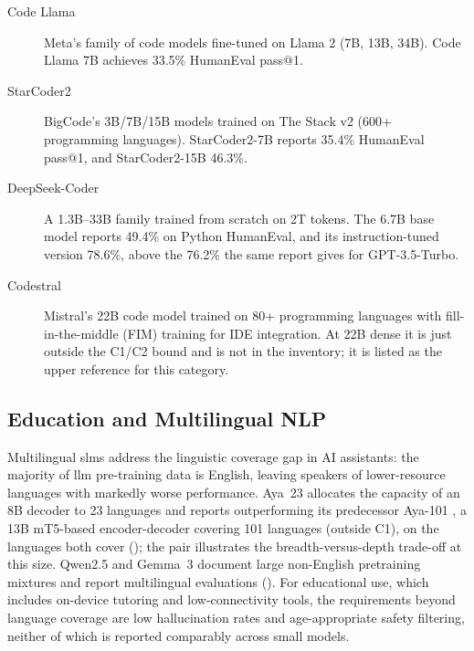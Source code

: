 \begin{description}
    \item[Code Llama \citep{roziere2023codellama}] Meta's family of code models fine-tuned on Llama 2 (7B, 13B, 34B). Code Llama 7B achieves 33.5\% HumanEval pass@1.

    \item[StarCoder2 \citep{lozhkov2024starcoder2}] BigCode's 3B/7B/15B models trained on The Stack v2 (600+ programming languages). StarCoder2-7B reports 35.4\% HumanEval pass@1, and StarCoder2-15B 46.3\%.

    \item[DeepSeek-Coder \citep{zhu2024deepseek_coder}] A 1.3B--33B family trained from scratch on 2T tokens. The 6.7B base model reports 49.4\% on Python HumanEval, and its instruction-tuned version 78.6\%, above the 76.2\% the same report gives for GPT-3.5-Turbo.

    \item[Codestral \citep{mistral2024codestral}] Mistral's 22B code model trained on 80+ programming languages with fill-in-the-middle (FIM) training for IDE integration. At 22B dense it is just outside the C1/C2 bound and is not in the inventory; it is listed as the upper reference for this category.
\end{description}

\subsection{Education and Multilingual NLP}
\label{subsec:applications_multilingual}

Multilingual \glspl{slm} address the linguistic coverage gap in AI assistants: the majority of \gls{llm} pre-training data is English, leaving speakers of lower-resource languages with markedly worse performance. Aya~23 \citep{aryabumi2024aya23} allocates the capacity of an 8B decoder to 23 languages and reports outperforming its predecessor Aya-101 \citep{ustun2024aya}, a 13B mT5-based encoder-decoder covering 101 languages (outside C1), on the languages both cover (\evC); the pair illustrates the breadth-versus-depth trade-off at this size. Qwen2.5 \citep{qwen2024qwen25} and Gemma~3 \citep{team2025gemma3} document large non-English pretraining mixtures and report multilingual evaluations (\evC). For educational use, which includes on-device tutoring and low-connectivity tools, the requirements beyond language coverage are low hallucination rates and age-appropriate safety filtering, neither of which is reported comparably across small models.
